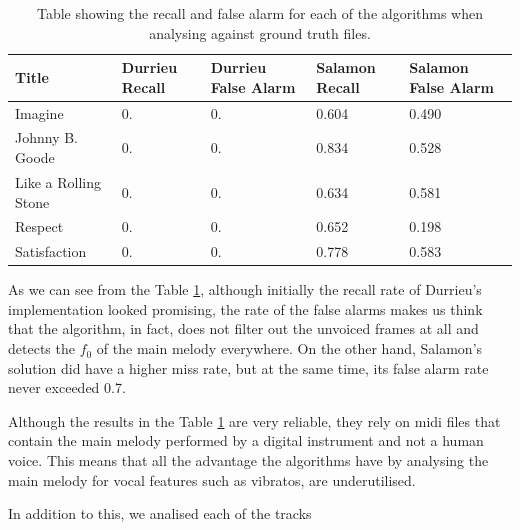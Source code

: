 \begin{table}
\begin{center}
\begin{tabular} {| p{5cm}| p{1.75cm} | p{1.75cm} | p{1.75cm} | p{1.75cm} |} \hline
Title 	& Durrieu Recall & Durrieu False Alarm 	& Salamon Recall 	& Salamon False Alarm \\ \hline \hline
Imagine						& 0.			& 0.		& 0.604			& 0.490		\\	\hline
Johnny B. Goode		& 0.			& 0.		& 0.834			& 0.528		\\ 	\hline
Like a Rolling Stone	& 0.			& 0.		& 0.634			& 0.581		\\ 	\hline
Respect						& 0.			& 0.		& 0.652			& 0.198		\\ 	\hline
Satisfaction				& 0.			& 0.		& 0.778			& 0.583		\\	\hline
\end{tabular}
\caption{Table showing the recall and false alarm for each of the algorithms when analysing against ground truth files.}
\label{table:voicedunvoiced}
\end{center}
\end{table}

As we can see from the Table \ref{table:voicedunvoiced}, although initially the recall rate of Durrieu's implementation looked promising, the rate of the false alarms makes us think that the algorithm, in fact, does not filter out the unvoiced frames at all and detects the $f_{0}$ of the main melody everywhere. On the other hand, Salamon's solution did have a higher miss rate, but at the same time, its false alarm rate never exceeded 0.7.

Although the results in the Table \ref{table:voicedunvoiced} are very reliable, they rely on midi files that contain the main melody performed by a digital instrument and not a human voice. This means that all the advantage the algorithms have by analysing the main melody for vocal features such as vibratos, are underutilised. 

In addition to this, we analised each of the tracks 



